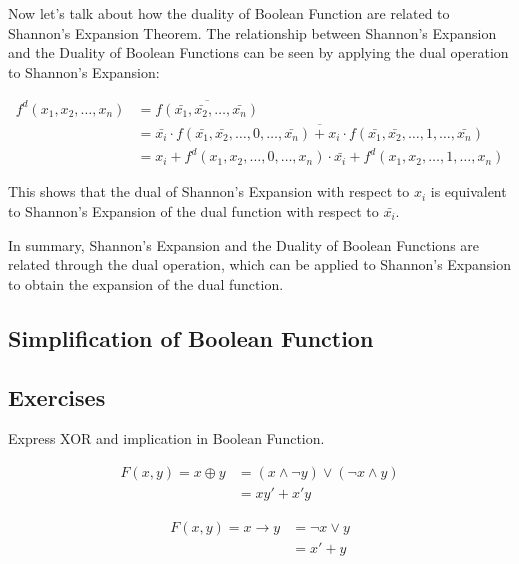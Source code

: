    Now let's talk about how the duality of Boolean Function are related to Shannon's Expansion Theorem.
    The relationship between Shannon's Expansion and the Duality of Boolean Functions can be seen by applying the dual operation to Shannon's Expansion:

    \begin{align*}
    f^d(x_1, x_2, \ldots, x_n) &= \overline{f(\bar{x_1}, \bar{x_2}, \ldots, \bar{x_n})} \\
    &= \overline{\bar{x_i} \cdot f(\bar{x_1}, \bar{x_2}, \ldots,0, \ldots, \bar{x_n}) + x_i \cdot f(\bar{x_1}, \bar{x_2}, \ldots, 1,\ldots, \bar{x_n})} \\
    &= x_i + f^d(x_1, x_2, \ldots,0, \ldots, x_n) \cdot \bar{x_i} + f^d(x_1, x_2, \ldots, 1,\ldots, x_n)
    \end{align*}

    This shows that the dual of Shannon's Expansion with respect to $x_i$ is equivalent to Shannon's Expansion of the dual function with respect to $\bar{x_i}$.

    In summary, Shannon's Expansion and the Duality of Boolean Functions are related through the dual operation, which can be applied to Shannon's Expansion to obtain the expansion of the dual function.
    \subsection{Simplification of Boolean Function}
        

    \subsection{Exercises}
    \begin{exercise}
        Express XOR and implication in Boolean Function.
    \end{exercise}
    \begin{solution}
        \begin{align*}
            F(x,y)= x \oplus y &= (x \land \lnot y) \lor (\lnot x \land y)\\
                       &= xy' + x'y
            \end{align*}

            \begin{align*}
                F(x,y)= x \rightarrow y &= \lnot x \lor y\\
                                &= x' + y
                \end{align*}
    \end{solution}

